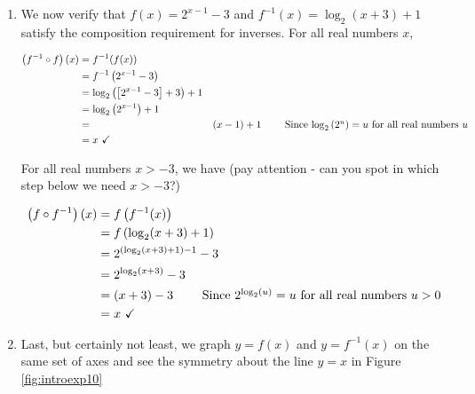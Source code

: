 {\begin{enumerate}
\item  We now verify that $f(x) = 2^{x-1}-3$ and $f^{-1}(x) = \log_{2}(x+3)+1$ satisfy the composition requirement for inverses.  For all real numbers $x$, 

\begin{align*}
\left(f^{-1}\circ f\right)(x) & =  f^{-1}(f(x))  \\
& =  f^{-1}\left(2^{x-1}-3 \right)  \\
& =  \log_{2}\left( \left[2^{x-1}-3\right]+3 \right)+1  \\
& =  \log_{2}\left( 2^{x-1} \right)+1  \\
& =& (x-1) +1  \tag*{ Since $\log_{2}\left(2^{u}\right) = u$ for all real numbers $u$} \\
& =  x \, \, \checkmark 
\end{align*}


For all real numbers $x > -3$, we have (pay attention - can you spot in which step below we need $x > -3$?)

\begin{align*}
\left(f\circ f^{-1}\right)(x) & =  f\left(f^{-1}(x)\right)  \\
& =  f\left( \log_{2}(x+3)+1 \right)  \\
& =  2^{\left( \log_{2}(x+3)+1 \right)-1} - 3  \\
& =  2^{\log_{2}(x+3)} - 3  \\
& =  (x+3) -3 \tag*{ Since $2^{\log_{2}(u)} = u$ for all real numbers $u > 0$} \\
& =  x \, \, \checkmark 
\end{align*}


\item  Last, but certainly not least, we graph $y=f(x)$ and $y=f^{-1}(x)$ on the same set of axes and see the symmetry about the line $y=x$ in Figure \ref{fig:introexp10}


\end{enumerate}
}

\label{IntroExpLogsExercises}
